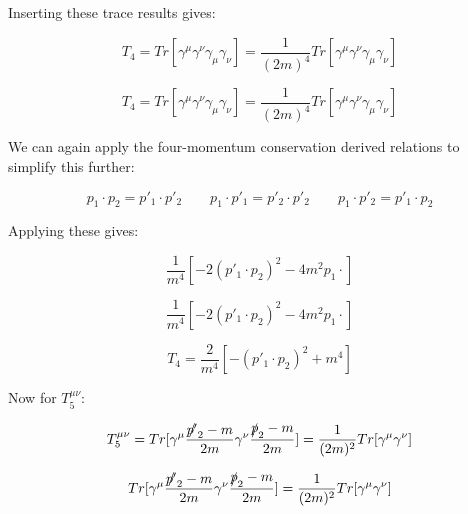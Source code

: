 \documentclass[a4]{article}
\begin{document}

    Inserting these trace results gives:

    \begin{equation}
        T_4 = Tr [\gamma^\mu \gamma^\nu \gamma_\mu \gamma_\nu] = \frac{1}{(2 m)^4} Tr [\gamma^\mu \gamma^\nu \gamma_\mu \gamma_\nu]
    \end{equation}

    \begin{equation}
        T_4 = Tr [\gamma^\mu \gamma^\nu \gamma_\mu \gamma_\nu] = \frac{1}{(2 m)^4} Tr [\gamma^\mu \gamma^\nu \gamma_\mu \gamma_\nu]
    \end{equation}

    We can again apply the four-momentum conservation derived relations to simplify this further:

    \begin{equation}
        p_1 \cdot p_2 = p'_1 \cdot p'_2 \qquad p_1 \cdot p'_1 = p'_2 \cdot p'_2 \qquad p_1 \cdot p'_2 = p'_1 \cdot p_2
    \end{equation}

    Applying these gives:

    \begin{equation}
        \frac{1}{m^4} [- 2 (p'_1 \cdot p_2)^2 - 4 m^2 p_1 \cdot]
    \end{equation}

    \begin{equation}
        \frac{1}{m^4} [- 2 (p'_1 \cdot p_2)^2 - 4 m^2 p_1 \cdot]
    \end{equation}

    \begin{framed}
        \begin{equation}
            T_4 = \frac{2}{m^4} [- (p'_1 \cdot p_2)^2 + m^4]
        \end{equation}
    \end{framed}

    Now for $T^{\mu \nu}_5$:

    \begin{equation}
        T_5^{\mu \nu} = Tr [\gamma^\mu \frac{\slashed{p'}_2 - m}{2m} \gamma^\nu \frac{\slashed{p}_2 - m}{2 m}] = \frac{1}{(2m)^2} Tr[\gamma^\mu \gamma^\nu]
    \end{equation}

    \begin{equation}
        Tr [\gamma^\mu \frac{\slashed{p'}_2 - m}{2m} \gamma^\nu \frac{\slashed{p}_2 - m}{2 m}] = \frac{1}{(2m)^2} Tr[\gamma^\mu \gamma^\nu]
    \end{equation}
\end{document}
